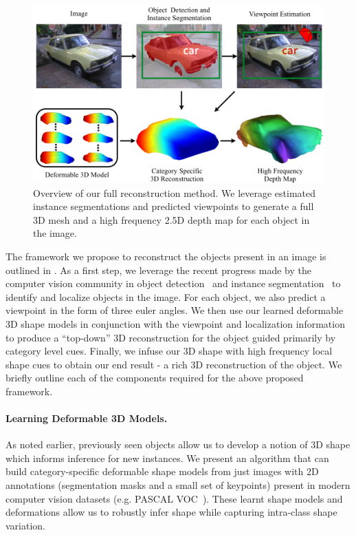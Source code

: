 \begin{figure}[t]
\centering
\includegraphics[width = .9\textwidth]{figures/categoryshapes/figTest.pdf}
\caption{Overview of our full reconstruction method. We leverage estimated instance segmentations and predicted viewpoints to generate a full 3D mesh and a high frequency 2.5D depth map for each object in the image.}
\end{figure}

The framework we propose to reconstruct the objects present in an image is outlined in . As a first step, we leverage the recent progress made by the computer vision community in object detection~\cite{rcnn} and instance segmentation~\cite{BharathECCV2014, BharathCVPR2015} to identify and localize objects in the image. For each object, we also predict a viewpoint in the form of three euler angles. We then use our learned deformable 3D shape models in conjunction with the viewpoint and localization information to produce a ``top-down'' 3D reconstruction for the object guided primarily by category level cues. Finally, we infuse our 3D shape with high frequency local shape cues to obtain our end result - a rich 3D reconstruction of the object. We briefly outline each of the components required for the above proposed framework.

\paragraph{Learning Deformable 3D Models.}
As noted earlier, previously seen objects allow us to develop a notion of 3D shape which informs inference for new instances. We present an algorithm that can build category-specific  deformable shape models from just images with 2D annotations (segmentation masks and a small set of keypoints) present in modern computer vision datasets (e.g. PASCAL VOC~\cite{pascal-voc-2012}). These learnt shape models and deformations allow us to robustly infer shape while capturing intra-class shape variation.

